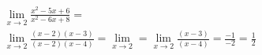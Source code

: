 \begin{ex}
\begin{align}
&\lim_{x\rightarrow 2} \frac{x^2-5x+6}{x^2-6x+8}=\nonumber\\
&\lim_{x\rightarrow 2} \frac{(x-2)(x-3)}{(x-2)(x-4)}=\lim_{x\rightarrow 2} = \lim_{x\rightarrow 2} \frac{(x-3)}{(x-4)}=\frac{-1}{-2}=\frac{1}{2}\nonumber
\end{align}
\end{ex}